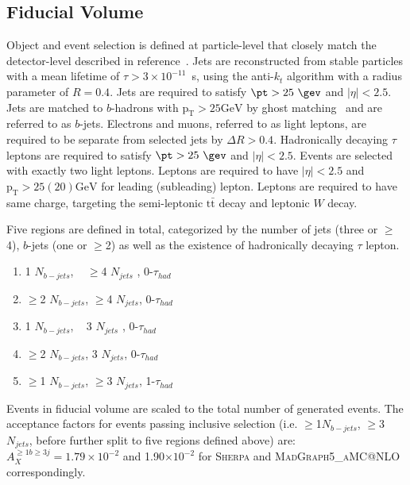 
\subsection{Fiducial Volume}
Object and event selection is defined at particle-level that closely match the detector-level described in reference~\cite{HIGG-2017-02}. 
Jets are reconstructed from stable particles with a mean lifetime of $\tau > 3\times 10^{-11}$~s, using the anti-$k_t$ algorithm with a radius parameter of $R=0.4$.
Jets are required to satisfy $\pt > 25~\gev$ and $|\eta| < 2.5$.
Jets are matched to $b$-hadrons with $\mathrm{p_{T}>25 GeV}$ by ghost matching~\cite{70ttbb} and are referred to as $b$-jets. 
Electrons and muons, referred to as light leptons, are required to be separate from selected jets by $\Delta R>0.4$. 
Hadronically decaying $\tau$ leptons are required to satisfy $\pt > 25~\gev$ and $|\eta| < 2.5$.
Events are selected with exactly two light leptons.
Leptons are required to have $|\eta|< 2.5$ and $\mathrm{p_{T}>25(20) GeV}$ for leading (subleading) lepton. 
Leptons are required to have same charge, targeting the semi-leptonic $\mathrm{t\bar{t}}$ decay and leptonic $W$ decay.

 
Five regions are defined in total, categorized by the number of jets (three or  $\geq$4), $b$-jets (one or $\geq$2) as well as the existence of hadronically decaying $\tau$ lepton. 
				\begin{enumerate}
				\item  1 $N_{b-jets}$, ~ $\geq$4 $N_{jets}$ , 0-$\tau_{had}$
				\item  $\geq$2 $N_{b-jets}$,   $\geq$4 $N_{jets}$, 0-$\tau_{had}$
				\item  1 $N_{b-jets}$, ~  3 $N_{jets}$ , 0-$\tau_{had}$
				\item  $\geq$2 $N_{b-jets}$, 3 $N_{jets}$, 0-$\tau_{had}$
				\item $\geq$1 $N_{b-jets}$, $\geq$3 $N_{jets}$, 1-$\tau_{had}$
				\end{enumerate}


Events in fiducial volume are scaled to the total number of generated events. 
The acceptance factors for events passing inclusive selection (i.e. $\geq$1$N_{b-jets}$, $\geq$3 $N_{jets}$, before further split to five regions defined above) are: $A_X^{\geq1b\geq3j}=1.79\times10^{-2}$ and 1.90$\times10^{-2}$ for \textsc{Sherpa} and \textsc{MadGraph5\_aMC@NLO} correspondingly.


